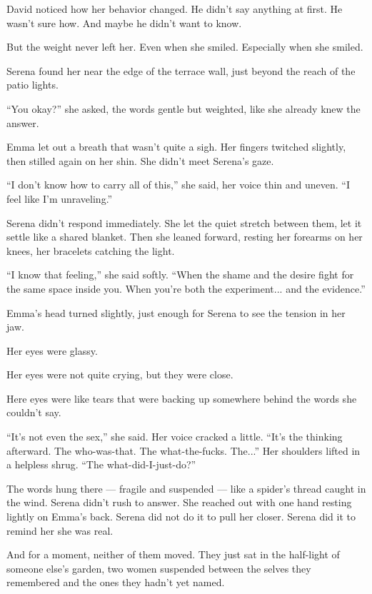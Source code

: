 \medskip

David noticed how her behavior changed. He didn’t say anything at first. He wasn’t sure how. 
And maybe he didn’t want to know. 

But the weight never left her. Even when she smiled. Especially when she smiled.

Serena found her near the edge of the terrace wall, just beyond the reach of the patio lights. 

``You okay?'' she asked, the words gentle but weighted, like she already knew the answer.

Emma let out a breath that wasn’t quite a sigh. Her fingers twitched slightly, then stilled again on her 
shin. She didn’t meet Serena’s gaze.

``I don’t know how to carry all of this,'' she said, her voice thin and uneven. ``I feel like I’m 
unraveling.''

Serena didn’t respond immediately. She let the quiet stretch between them, let it settle like a shared 
blanket. Then she leaned forward, resting her forearms on her knees, her bracelets catching the light.

``I know that feeling,'' she said softly. ``When the shame and the desire fight for the same space inside 
you. When you’re both the experiment... and the evidence.''

Emma’s head turned slightly, just enough for Serena to see the tension in her jaw. 

Her eyes were glassy. 

Her eyes were not quite crying, but they were close. 

Here eyes were like tears that were backing up somewhere behind the words she couldn’t 
say. 

``It’s not even the sex,'' she said. Her voice cracked a little. ``It’s the thinking afterward. The 
who-was-that. The what-the-fucks. The...'' Her shoulders lifted in a helpless shrug. 
``The what-did-I-just-do?''

The words hung there --- fragile and suspended --- like a spider’s thread caught in the wind. Serena didn’t 
rush to answer. She reached out with one hand resting lightly on Emma’s back. Serena did not do it 
to pull her closer. Serena did it to remind her she was real.

And for a moment, neither of them moved. They just sat in the half-light of someone else’s garden, 
two women suspended between the selves they remembered and the ones they hadn’t yet named.

